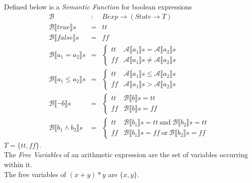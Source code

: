 \documentclass[11pt,a4paper]{article}
\begin{document}
Defined below is a \textit{Semantic Function} for boolean expressions
\[\begin{array}{lcl}
\mathcal{B}&:&Bexp\to(State\to T)\\
\mathcal{B}\llbracket  true\rrbracket s&=&tt\\
\mathcal{B}\llbracket  false\rrbracket s&=&ff\\
\mathcal{B}\llbracket  a_1=a_2\rrbracket s&=&\begin{cases}tt&\mathcal{A}\llbracket  a_1\rrbracket s=\mathcal{A}\llbracket  a_2\rrbracket s\\ff&\mathcal{A}\llbracket  a_1\rrbracket s\neq\mathcal{A}\llbracket  a_2\rrbracket s\end{cases}\\
\mathcal{B}\llbracket  a_1\leq a_2\rrbracket s&=&\begin{cases}tt&\mathcal{A}\llbracket  a_1\rrbracket s\leq\mathcal{A}\llbracket  a_2\rrbracket s\\ff&\mathcal{A}\llbracket  a_1\rrbracket s>\mathcal{A}\llbracket  a_2\rrbracket s\end{cases}\\
\mathcal{B}\llbracket  \neg b\rrbracket s&=&\begin{cases}tt&\mathcal{B}\llbracket  b\rrbracket s=tt\\ff&\mathcal{B}\llbracket  b\rrbracket s=ff\end{cases}\\
\mathcal{B}\llbracket  b_1\wedge b_2\rrbracket s&=&\begin{cases}tt&\mathcal{B}\llbracket  b_1\rrbracket s=tt\ \mathrm{and}\ \mathcal{B}\llbracket  b_2\rrbracket s=tt\\ff&\mathcal{B}\llbracket  b_1\rrbracket s=ff\ \mathrm{or}\ \mathcal{B}\llbracket  b_2\rrbracket s=ff\end{cases}
\end{array}\]
\NB $T=\{tt,ff\}$.\\

The \textit{Free Variables} of an arithmetic expression are the set of variables occurring within it.\\
\eg The free variables of $(x+y)*y$ are $\{x,y\}$.\\
\end{document}
